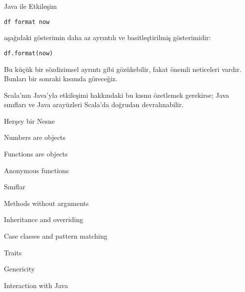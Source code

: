 \documentclass[10pt,a4paper]{book}
\begin{document}
\begin{chapter}{Java ile Etkileşim}
\begin{verbatim}
df format now
\end{verbatim}

aşağıdaki gösterimin daha az ayrıntılı ve basitleştirilmiş gösterimidir:

\begin{verbatim}
df.format(now)
\end{verbatim}

Bu küçük bir sözdizimsel ayrıntı gibi gözükebilir, fakat önemli neticeleri vardır. Bunları bir sonraki kısımda göreceğiz.

Scala'nın Java'yla etkileşimi hakkındaki bu kısmı özetlemek gerekirse; Java sınıfları ve Java arayüzleri Scala'da doğrudan devralınabilir.
\end{chapter}

\begin{chapter}{Herşey bir Nesne}

\begin{section}{Numbers are objects}

\end{section}

\begin{section}{Functions are objects}

\begin{subsection}{Anonymous functions}

\end{subsection}

\end{section}

\end{chapter}

\begin{chapter}{Sınıflar}

\begin{section}{Methods without arguments}

\end{section}

\begin{section}{Inheritance and overriding}

\end{section}

\end{chapter}

\begin{chapter}{Case classes and pattern matching}

\end{chapter}

\begin{chapter}{Traits}

\end{chapter}

\begin{chapter}{Genericity}

\end{chapter}

\begin{chapter}{Interaction with Java}

\end{chapter}
\end{document}
